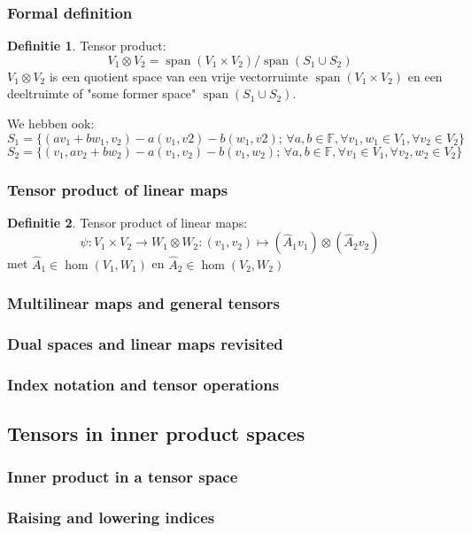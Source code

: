 \documentclass[a4paper,twoside]{article}
\theoremstyle{definition}
\newtheorem{definition}{Definitie}
\theoremstyle{plain}
\begin{document}
\subsubsection{Formal definition}
\begin{definition}
    Tensor product:
    \[
    V_1 \otimes V_2 = \operatorname{span}(V_1 \times V_2)/ \operatorname{span}(S_1 \cup S_2)
    \]
    \( V_1 \otimes V_2 \) is een quotient space van een vrije vectorruimte \(\operatorname{span}(V_1 \times V_2)\)
    en een deeltruimte of "some former space" \(\operatorname{span}(S_1 \cup S_2)\).

    We hebben ook:
    \[
    S_1 = \{(av_1 + bw_1 , v_2) - a(v_1,v2)-b(w_1,v2);\, \forall a,b \in \mathbb{F},\forall v_1,w_1 \in V_1, \forall v_2 \in V_2\}
    \]
    \[
    S_2 = \{(v_1, av_2 + bw_2) - a(v_1,v_2)-b(v_1,w_2);\, \forall a,b \in \mathbb{F},\forall v_1 \in V_1, \forall v_2,w_2 \in V_2\}
    \]
\end{definition}
\subsubsection{Tensor product of linear maps}
\begin{definition}
    Tensor product of linear maps:
    \[
    \psi : V_1 \times V_2 \to W_1 \otimes W_2 : (v_1,v_2) \mapsto (\hat{A}_1v_1)\otimes(\hat{A}_2v_2)
    \]
    met \(\hat{A}_1 \in \hom (V_1, W_1)\) en \(\hat{A}_2 \in \hom (V_2, W_2)\)
\end{definition}
\subsubsection{Multilinear maps and general tensors}
\subsubsection{Dual spaces and linear maps revisited}
\subsubsection{Index notation and tensor operations}
\subsection{Tensors in inner product spaces}
\subsubsection{Inner product in a tensor space}
\subsubsection{Raising and lowering indices}
\end{document}
